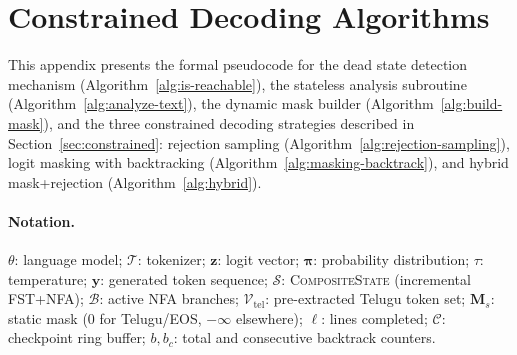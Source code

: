 %
%
%

\section{Constrained Decoding Algorithms}
\label{app:algorithms}

This appendix presents the formal pseudocode for the dead state detection
mechanism (Algorithm~\ref{alg:is-reachable}), the stateless analysis
subroutine (Algorithm~\ref{alg:analyze-text}), the dynamic mask builder
(Algorithm~\ref{alg:build-mask}), and the three constrained decoding
strategies described in Section~\ref{sec:constrained}:
rejection sampling (Algorithm~\ref{alg:rejection-sampling}),
logit masking with backtracking (Algorithm~\ref{alg:masking-backtrack}),
and hybrid mask+rejection (Algorithm~\ref{alg:hybrid}).

\paragraph{Notation.}
$\theta$: language model;\;
$\mathcal{T}$: tokenizer;\;
$\mathbf{z}$: logit vector;\;
$\boldsymbol{\pi}$: probability distribution;\;
$\tau$: temperature;\;
$\mathbf{y}$: generated token sequence;\;
$\mathcal{S}$: \textsc{CompositeState} (incremental FST+NFA);\;
$\mathcal{B}$: active NFA branches;\;
$\mathcal{V}_{\text{tel}}$: pre-extracted Telugu token set;\;
$\mathbf{M}_s$: static mask ($0$ for Telugu/EOS, $-\infty$ elsewhere);\;
$\ell$: lines completed;\;
$\mathcal{C}$: checkpoint ring buffer;\;
$b, b_c$: total and consecutive backtrack counters.




